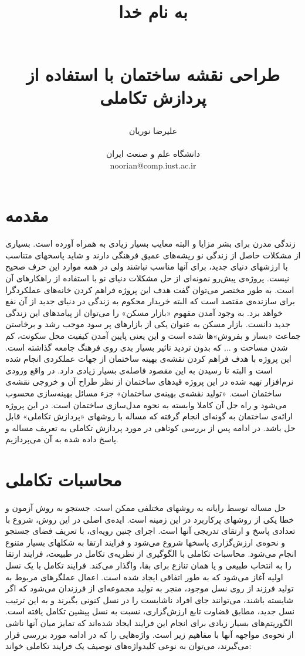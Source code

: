 \documentclass{report}
\title{ 
\begin{normalsize} به نام خدا \end{normalsize}
\\[7cm]
طراحی نقشه ساختمان با استفاده از پردازش تکاملی
\\[3cm]
}
\author{علیرضا نوریان
\\
\\ \small دانشگاه علم و صنعت ایران
\\ \small noorian@comp.iust.ac.ir
}
\begin{document}
\maketitle

\tableofcontents

\begin{abstract}

\end{abstract}

\section{مقدمه}
زندگی مدرن برای بشر مزایا و البته معایب بسیار زیادی به همراه آورده است. بسیاری از مشکلات حاصل از زندگی نو ریشه‌های عمیق فرهنگی دارند و شاید پاسخهای متناسب با ارزشهای دنیای جدید، برای آنها مناسب نباشند ولی در همه موارد این حرف صحیح نیست. پروژه‌ی پیش‌رو نمونه‌ای از حل مشکلات دنیای نو با استفاده از راهکارهای آن است. به طور مختصر می‌توان گفت هدف این پروژه فراهم کردن خانه‌های عملکردگرا برای سازنده‌ی مقتصد است که البته خریدار محکوم به زندگی در دنیای جدید از آن نفع خواهد برد.
به وجود آمدن مفهوم «بازار مسکن» را می‌توان از پیامدهای این زندگی جدید دانست. بازار مسکن به عنوان یکی از بازارهای پر سود موجب رشد و برخاستن جماعت «بساز و بفروش»ها شده است و این یعنی پایین آمدن کیفیت محل سکونت، کم شدن مساحت و ... که بدون تردید تاثیر بسیار بدی روی فرهنگ جامعه گذاشته است. این پروژه با هدف فراهم کردن نقشه‌ی بهینه ساختمان از جهات عملکردی انجام شده است و البته تا رسیدن به این مقصود فاصله‌ی بسیار زیادی دارد. در واقع ورودی نرم‌افزار تهیه شده در این پروژه قیدهای ساختمان از نظر طراح آن و خروجی نقشه‌ی ساختمان است.
«تولید نقشه‌ی بهینه‌ی ساختمان» جزء مسائل بهینه‌سازی محسوب می‌شود و راه حل آن کاملا وابسته به نحوه مدل‌سازی ساختمان است. در این پروژه ارائه‌ی ساختمان به گونه‌ای انجام گرفته که مساله با روشهای «پردازش تکاملی» قابل حل باشد. در ادامه پس از بررسی کوتاهی در مورد پردازش تکاملی به تعریف مساله و پاسخ داده شده به آن می‌پردازیم.

\section{محاسبات تکاملی}
حل مساله توسط رایانه به روشهای مختلفی ممکن است. جستجو به روش آزمون و خطا یکی از روشهای پرکاربرد در این زمینه است. ایده‌ی اصلی در این روش، شروع با تعدادی پاسخ و ارتقای تدریجی آنها است. اجرای چنین رویه‌ای، با تعریف فضای جستجو و نحوه‌ی ارزش‌گزاری پاسخها شروع می‌شود و فرایند ارتقا به شکلهای بسیار متنوع انجام می‌شود. محاسبات تکاملی با الگوگیری از نظریه‌ی تکامل در طبیعت، فرایند ارتقا را به انتخاب طبیعی و یا همان تنازع برای بقا، واگذار می‌کند.
فرایند تکامل با یک نسل اولیه آغاز می‌شود که به طور اتفاقی ایجاد شده است. اعمال عملگرهای مربوط به تولید فرزند از روی نسل موجود، منجر به تولید مجموعه‌ای از فرزندان می‌شود که اگر شایسته باشند، می‌توانند جای افراد ناشایست را در نسل کنونی بگیرند و به این ترتیب نسل جدید، مطابق قضاوت تابع ارزش‌گزاری، نسبت به نسل پیشین تکامل یافته است.
الگوریتم‌های بسیار زیادی برای انجام این فرایند ایجاد شده‌اند که تمایز میان آنها ناشی از نحوه‌ی مواجهه آنها با مفاهیم زیر است. واژه‌هایی را که در ادامه مورد بررسی قرار می‌گیرند، می‌توان به نوعی کلیدواژه‌های توصیف یک فرایند تکاملی خواند:
\end{document}
